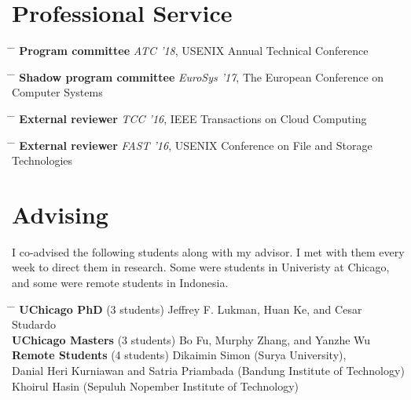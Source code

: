 \documentclass[10pt]{article} %
\begin{document}
\section{Professional Service}

\begin{tabbing}
\hspace{2.5cm} \= \hspace{5.5cm}  \=  \> \textbf{Program committee} \> \textit{ATC '18}, USENIX Annual Technical Conference
\end{tabbing}

\begin{tabbing}
\hspace{2.5cm} \= \hspace{5.5cm}  \=  \> \textbf{Shadow program committee} \> \textit{EuroSys '17}, The European Conference on Computer Systems
\end{tabbing}

\begin{tabbing}
\hspace{2.5cm} \= \hspace{5.5cm}  \=  \> \textbf{External reviewer} \> \textit{TCC '16}, IEEE Transactions on Cloud Computing 
\end{tabbing}

\begin{tabbing}
\hspace{2.5cm} \= \hspace{5.5cm}  \=  \> \textbf{External reviewer} \> \textit{FAST '16}, USENIX Conference on File and Storage Technologies
\end{tabbing}


\section{Advising}

I co-advised the following students along with my advisor. I met with them
every week to direct them in research. Some were students in Univeristy at
Chicago, and some were remote students in Indonesia.
\begin{tabbing}
\hspace{3.5cm} \= \hspace{2.5cm} \= \kill
\textbf{UChicago PhD} \> (3 students) \> Jeffrey F. Lukman, Huan Ke, and Cesar Studardo\\
\textbf{UChicago Masters} \> (3 students) \> Bo Fu, Murphy Zhang, and Yanzhe Wu\\
\textbf{Remote Students} \> (4 students) \> Dikaimin Simon (Surya University),\\
\> \>Danial Heri Kurniawan and Satria Priambada (Bandung Institute of Technology)\\
\> \>Khoirul Hasin (Sepuluh Nopember Institute of Technology)
\end{tabbing}
\end{document}
